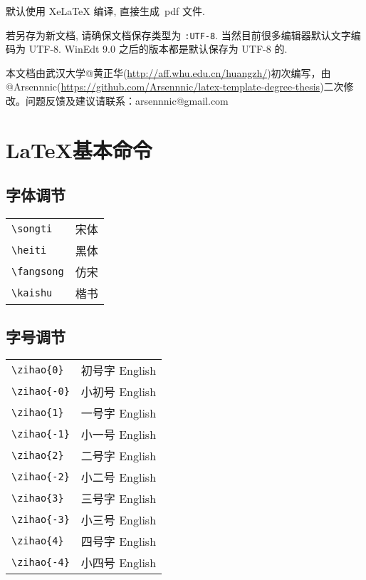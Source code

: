 \documentclass[forprint]{WHUBachelor}
\begin{document}
默认使用 XeLaTeX 编译, 直接生成~pdf 文件.

若另存为新文档, 请确保文档保存类型为 \verb|:UTF-8|. 当然目前很多编辑器默认文字编码为 UTF-8.
WinEdt 9.0 之后的版本都是默认保存为 UTF-8 的.


\vfill
本文档由武汉大学@黄正华(\url{http://aff.whu.edu.cn/huangzh/})初次编写，由@Arsennnic(\url{https://github.com/Arsennnic/latex-template-degree-thesis})二次修改。问题反馈及建议请联系：arsennnic@gmail.com


\chapter{\LaTeX 基本命令}
\section{字体调节}

\begin{tabular}{ll}
	\verb|\songti|   & {\songti 宋体}   \\
	\verb|\heiti|    & {\heiti 黑体}    \\
	\verb|\fangsong| & {\fangsong 仿宋} \\
	\verb|\kaishu|   & {\kaishu 楷书}
\end{tabular}


\section{字号调节}

\begin{tabular}{ll}
	\verb|\zihao{0}| &\zihao{0}  初号字 English \\
	\verb|\zihao{-0}|&\zihao{-0} 小初号 English \\
	\verb|\zihao{1} |&\zihao{1}  一号字 English \\
	\verb|\zihao{-1}|&\zihao{-1} 小一号 English \\
	\verb|\zihao{2} |&\zihao{2}  二号字 English \\
	\verb|\zihao{-2}|&\zihao{-2} 小二号 English \\
	\verb|\zihao{3} |&\zihao{3}  三号字 English \\
	\verb|\zihao{-3}|&\zihao{-3} 小三号 English \\
	\verb|\zihao{4} |&\zihao{4}  四号字 English \\
	\verb|\zihao{-4}|&\zihao{-4} 小四号 English \\
\end{tabular}
\end{document}
